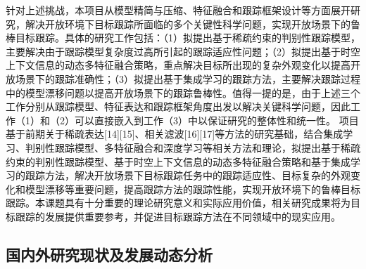 \documentclass[a4paper,zihao=-4]{article}
\begin{document}
针对上述挑战，本项目从模型精简与压缩、特征融合和跟踪框架设计等方面展开研究，解决开放环境下目标跟踪所面临的多个关键性科学问题，实现开放场景下的鲁棒目标跟踪。具体的研究工作包括：（1）拟提出基于稀疏约束的判别性跟踪模型，主要解决由于跟踪模型复杂度过高所引起的跟踪适应性问题；（2）拟提出基于时空上下文信息的动态多特征融合策略，重点解决目标所出现的复杂外观变化以提高开放场景下的跟踪准确性；（3）拟提出基于集成学习的跟踪方法，主要解决跟踪过程中的模型漂移问题以提高开放场景下的跟踪鲁棒性。值得一提的是，由于上述三个工作分别从跟踪模型、特征表达和跟踪框架角度出发以解决关键科学问题，因此工作（1）和（2）可以直接嵌入到工作（3）中以保证研究的整体性和统一性。
项目基于前期关于稀疏表达[14][15]、相关滤波[16][17]等方法的研究基础，结合集成学习、判别性跟踪模型、多特征融合和深度学习等相关方法和理论，拟提出基于稀疏约束的判别性跟踪模型、基于时空上下文信息的动态多特征融合策略和基于集成学习的跟踪方法，解决开放场景下目标跟踪任务中的跟踪适应性、目标复杂的外观变化和模型漂移等重要问题，提高跟踪方法的跟踪性能，实现开放环境下的鲁棒目标跟踪。本课题具有十分重要的理论研究意义和实际应用价值，相关研究成果将为目标跟踪的发展提供重要参考，并促进目标跟踪方法在不同领域中的现实应用。


\subsection{国内外研究现状及发展动态分析}
\end{document}
